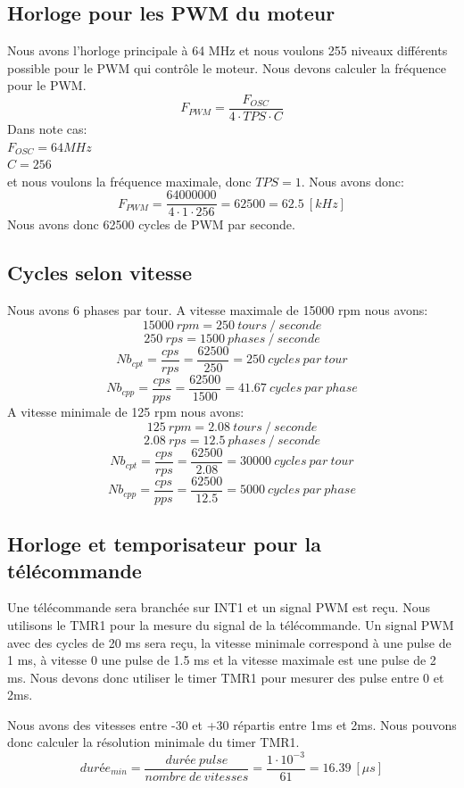 \documentclass[fleqn, 11pt, a4paper]{article}
\begin{document}
  \subsection{Horloge pour les PWM du moteur}
  Nous avons l'horloge principale à 64 MHz et nous voulons 255 niveaux différents possible pour le PWM qui contrôle le moteur.
  Nous devons calculer la fréquence pour le PWM.
  $$F_{PWM} = \frac{F_{OSC}}{4 \cdot TPS \cdot C}$$
  Dans note cas:\\
  $F_{OSC} = 64 MHz$\\
  $C = 256$\\
  et nous voulons la fréquence maximale, donc $TPS = 1$.
  Nous avons donc:
  $$F_{PWM} = \frac{64000000}{4 \cdot 1 \cdot 256} = 62500 = 62.5\ [kHz]$$
  Nous avons donc 62500 cycles de PWM par seconde.
  
  \subsection{Cycles selon vitesse}
  Nous avons 6 phases par tour.
  A vitesse maximale de 15000 rpm nous avons:
  $$15000 \ rpm = 250\ tours\ /\ seconde$$
  $$ 250 \ rps = 1500\ phases\ /\ seconde$$
  $$Nb_{cpt} = \frac{cps}{rps} = \frac{62500}{250} = 250\ cycles\ par\ tour$$
  $$Nb_{cpp} = \frac{cps}{pps} = \frac{62500}{1500} = 41.67\ cycles\ par\ phase$$
  A vitesse minimale de 125 rpm nous avons:
  $$125 \ rpm = 2.08\ tours\ /\ seconde$$
  $$ 2.08 \ rps = 12.5\ phases\ /\ seconde$$
  $$Nb_{cpt} = \frac{cps}{rps} = \frac{62500}{2.08} = 30000\ cycles\ par\ tour$$
  $$Nb_{cpp} = \frac{cps}{pps} = \frac{62500}{12.5} = 5000\ cycles\ par\ phase$$
  
  \subsection{Horloge et temporisateur pour la télécommande}
  Une télécommande sera branchée sur INT1 et un signal PWM est reçu.
  Nous utilisons le TMR1 pour la mesure du signal de la télécommande.
  Un signal PWM avec des cycles de 20 ms sera reçu, la vitesse minimale correspond à une pulse de 1 ms, à vitesse 0 une pulse de 1.5 ms et la vitesse maximale est une pulse de 2 ms.
  Nous devons donc utiliser le timer TMR1 pour mesurer des pulse entre 0 et 2ms.
  
  Nous avons des vitesses entre -30 et +30 répartis entre 1ms et 2ms.
  Nous pouvons donc calculer la résolution minimale du timer TMR1.
  $$durée_{min} = \frac{durée \ pulse}{nombre\ de\ vitesses} = \frac{1 \cdot 10^{-3}}{61} = 16.39 \ [\mu s]$$
\end{document}
